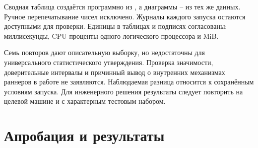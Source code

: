 Сводная таблица создаётся программно из , а диаграммы -- из тех же данных. Ручное перепечатывание чисел исключено. Журналы каждого запуска остаются доступными для проверки. Единицы в таблицах и подписях согласованы: миллисекунды, CPU-проценты одного логического процессора и MiB.

Семь повторов дают описательную выборку, но недостаточны для универсального статистического утверждения. Проверка значимости, доверительные интервалы и причинный вывод о внутренних механизмах раннеров в работе не заявляются. Наблюдаемая разница относится к сохранённым условиям запуска. Для инженерного решения результаты следует повторить на целевой машине и с характерным тестовым набором.

\section{Апробация и результаты}


